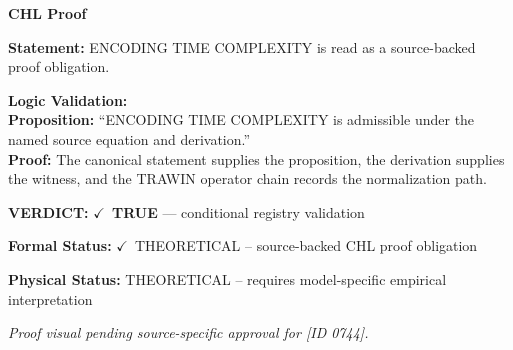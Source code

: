 \vspace{0.45em}
\noindent\textbf{CHL Proof}\par
\textbf{Statement:} ENCODING TIME COMPLEXITY is read as a source-backed proof obligation.

\textbf{Logic Validation:}\\
\textbf{Proposition:} ``ENCODING TIME COMPLEXITY is admissible under the named source equation and derivation.''\\
\textbf{Proof:} The canonical statement supplies the proposition, the derivation supplies the witness, and the TRAWIN operator chain records the normalization path.

\textbf{VERDICT:} \ensuremath{\checkmark}\ \textbf{TRUE} --- conditional registry validation

\textbf{Formal Status:} \ensuremath{\checkmark}\ THEORETICAL -- source-backed CHL proof obligation

\textbf{Physical Status:} THEORETICAL -- requires model-specific empirical interpretation
\par\vspace{0.45em}
\par
\vfill
\begingroup\footnotesize\itshape
Proof visual pending source-specific approval for [ID 0744].
\par\endgroup
\vfill
\endgroup
\endgroup
